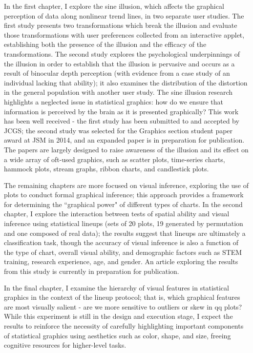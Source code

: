 \documentclass[11pt,letterpaper,sans,unicode]{moderncv}        %
\begin{document}
In the first chapter, I explore the sine illusion, which affects the graphical perception of data along nonlinear trend lines, in two separate user studies. The first study presents two transformations which break the illusion and evaluate those transformations with user preferences collected from an interactive applet, establishing both the presence of the illusion and the efficacy of the transformations. The second study explores the psychological underpinnings of the illusion in order to establish that the illusion is pervasive and occurs as a result of binocular depth perception (with evidence from a case study of an individual lacking that ability); it also examines the distribution of the distortion in the general population with another user study. The sine illusion research highlights a neglected issue in statistical graphics: how do we ensure that information is perceived by the brain as it is presented graphically? This work has been well received - the first study has been submitted to and accepted by JCGS; the second study was selected for the Graphics section student paper award at JSM in 2014, and an expanded paper is in preparation for publication. The papers are largely designed to raise awareness of the illusion and its effect on a wide array of oft-used graphics, such as scatter plots, time-series charts, hammock plots, stream graphs, ribbon charts, and candlestick plots. 

The remaining chapters are more focused on visual inference, exploring the use of plots to conduct formal graphical inference; this approach provides a framework for determining the ``graphical power" of different types of charts. In the second chapter, I explore the interaction between tests of spatial ability and visual inference using statistical lineups (sets of 20 plots, 19 generated by permutation and one composed of real data); the results suggest that lineups are ultimately a classification task, though the accuracy of visual inference is also a function of the type of chart, overall visual ability, and demographic factors such as STEM training, research experience, age, and gender. An article exploring the results from this study is currently in preparation for publication.

In the final chapter, I examine the hierarchy of visual features in statistical graphics in the context of the lineup protocol; that is, which graphical features are most visually salient - are we more sensitive to outliers or skew in qq plots? While this experiment is still in the design and execution stage, I expect the results to reinforce the necessity of carefully highlighting important components of statistical graphics using aesthetics such as color, shape, and size, freeing cognitive resources for higher-level tasks. 
\end{document}
